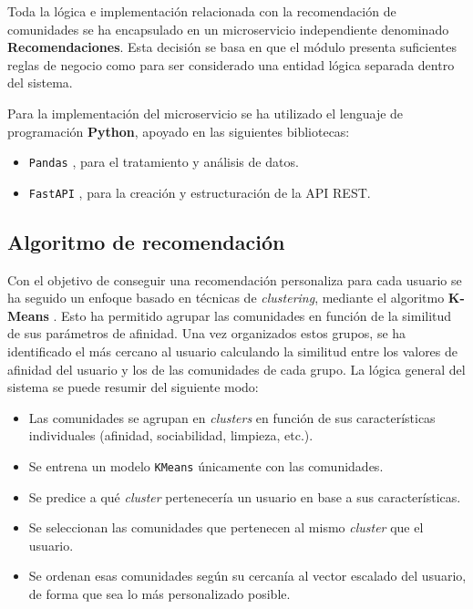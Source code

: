 Toda la lógica e implementación relacionada con la recomendación de comunidades se ha encapsulado en un microservicio independiente denominado \textbf{Recomendaciones}. Esta decisión se basa en que el módulo presenta suficientes reglas de negocio como para ser considerado una entidad lógica separada dentro del sistema.

\vspace{0.5em}
Para la implementación del microservicio se ha utilizado el lenguaje de programación \textbf{Python}, apoyado en las siguientes bibliotecas:

\begin{itemize}
    \item \texttt{Pandas} \cite{pandas}, para el tratamiento y análisis de datos.
    \item \texttt{FastAPI} \cite{fastapi}, para la creación y estructuración de la API REST.
\end{itemize}

\subsection*{Algoritmo de recomendación}

Con el objetivo de conseguir una recomendación personaliza para cada usuario se ha seguido un enfoque basado en técnicas de \textit{clustering}, mediante el algoritmo \textbf{K-Means} \cite{kmeans}. Esto ha permitido agrupar las comunidades en función de la similitud de sus parámetros de afinidad. Una vez organizados estos grupos, se ha identificado el más cercano al usuario calculando la similitud entre los valores de afinidad del usuario y los de las comunidades de cada grupo. La lógica general del sistema se puede resumir del siguiente modo:


\vspace{0.5em}
\begin{itemize}
    \item Las comunidades se agrupan en \textit{clusters} en función de sus características individuales (afinidad, sociabilidad, limpieza, etc.).
    \item Se entrena un modelo \texttt{KMeans} únicamente con las comunidades.
    \item Se predice a qué \textit{cluster} pertenecería un usuario en base a sus características.
    \item Se seleccionan las comunidades que pertenecen al mismo \textit{cluster} que el usuario.
    \item Se ordenan esas comunidades según su cercanía al vector escalado del usuario, de forma que sea lo más personalizado posible.
\end{itemize}

